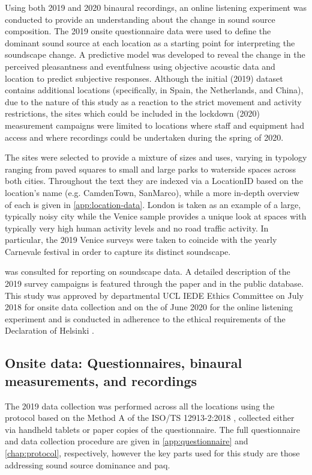  Using both 2019 and 2020 binaural recordings, an online listening experiment was conducted to provide an understanding about the change in sound source composition. The 2019 onsite questionnaire data were used to define the dominant sound source at each location as a starting point for interpreting the soundscape change. A predictive model was developed to reveal the change in the perceived pleasantness and eventfulness using objective acoustic data and location to predict subjective responses. Although the initial (2019) dataset contains additional locations (specifically, in Spain, the Netherlands, and China), due to the nature of this study as a reaction to the strict movement and activity restrictions, the sites which could be included in the lockdown (2020) measurement campaigns were limited to locations where staff and equipment had access and where recordings could be undertaken during the spring of 2020.

 The sites were selected to provide a mixture of sizes and uses, varying in typology ranging from paved squares to small and large parks to waterside spaces across both cities. Throughout the text they are indexed via a LocationID based on the location's name (e.g. CamdenTown, SanMarco), while a more in-depth overview of each is given in \cref{app:location-data}. London is taken as an example of a large, typically noisy city while the Venice sample provides a unique look at spaces with typically very high human activity levels and no road traffic activity. In particular, the 2019 Venice surveys were taken to coincide with the yearly Carnevale festival in order to capture its distinct soundscape.

\citet{ISO12913Part2} was consulted for reporting on soundscape data. A detailed description of the 2019 survey campaigns is featured through the paper and in the public database. This study was approved by departmental UCL IEDE Ethics Committee on  July 2018 for onsite data collection and on the  of June 2020 for the online listening experiment and is conducted in adherence to the ethical requirements of the Declaration of Helsinki \citep{WMA2013World}.

 \subsection{Onsite data: Questionnaires, binaural measurements, and recordings}
  The 2019 data collection was performed across all the locations using the protocol based on the Method A of the ISO/TS 12913-2:2018 \citep{ISO12913Part2}, collected either via handheld tablets or paper copies of the questionnaire. The full questionnaire and data collection procedure are given in \cref{app:questionnaire} and \cref{chap:protocol}, respectively, however the key parts used for this study are those addressing sound source dominance and \gls{paq}.
   
